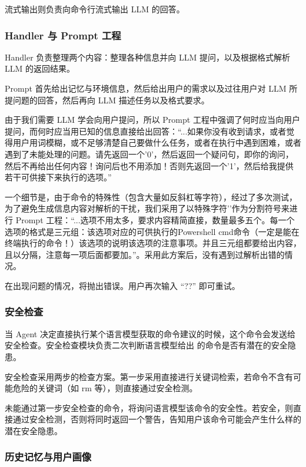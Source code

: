 \documentclass{article}
\theoremstyle{plain}
\theoremstyle{definition}
\theoremstyle{remark}
\begin{document}
流式输出则负责向命令行流式输出 LLM 的回答。

\subsubsection{Handler 与 Prompt 工程}

Handler 负责整理两个内容：整理各种信息并向 LLM 提问，以及根据格式解析 LLM 的返回结果。

Prompt 首先给出记忆与环境信息，然后给出用户的需求以及过往用户对 LLM 所提问题的回答，然后再向 LLM 描述任务以及格式要求。

由于我们需要 LLM 学会向用户提问，所以 Prompt 工程中强调了何时应当向用户提问，而何时应当用已知的信息直接给出回答：“...如果你没有收到请求，或者觉得用户用词模糊，或不足够清楚自己要做什么任务，或者在执行中遇到困难，或者遇到了未能处理的问题。请先返回一个'0'，然后返回一个疑问句，即你的询问，然后不再给出任何内容！询问后也不用添加{}！否则先返回一个'1'，然后给我提供若干可供接下来执行的选项。”

一个细节是，由于命令的特殊性（包含大量如反斜杠等字符），经过了多次测试，为了避免生成信息内容对解析的干扰，我们采用了以特殊字符'{}'作为分割符号来进行 Prompt 工程：“...选项不用太多，要求内容精简直接，数量最多五个。每一个选项的格式是三元组：该选项对应的可供执行的Powershell cmd命令（一定是能在终端执行的命令！）{}该选项的说明{}该选项的注意事项{}。并且三元组都要给出内容，且以{}分隔，注意每一项后面都要加{}。”。采用此方案后，没有遇到过解析出错的情况。

在出现问题的情况，将抛出错误。用户再次输入 “??” 即可重试。

\subsubsection{安全检查}

当 Agent 决定直接执行某个语言模型获取的命令建议的时候，这个命令会发送给安全检查。安全检查模块负责二次判断语言模型给出 的命令是否有潜在的安全隐患。

安全检查采用两步的检查方案。第一步采用直接进行关键词检索，若命令不含有可能危险的关键词（如 rm 等），则直接通过安全检测。

未能通过第一步安全检查的命令，将询问语言模型该命令的安全性。若安全，则直接通过安全检测，否则将同时返回一个警告，告知用户该命令可能会产生什么样的潜在安全隐患。

\subsubsection{历史记忆与用户画像}
\end{document}
